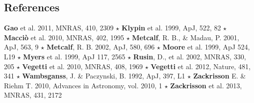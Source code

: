 \documentclass[a4paper, 11pt]{article}
\begin{document}
\subsection*{References}
{\bf Gao} et al. 2011, MNRAS, 410, 2309 $\star$
{\bf Klypin} et al. 1999, ApJ, 522, 82 $\star$
{\bf Macci\`o} et al. 2010, MNRAS, 402, 1995 $\star$
{\bf Metcalf}, R. B., \& Madau, P. 2001, ApJ, 563, 9 $\star$
{\bf Metcalf}, R. B. 2002, ApJ, 580, 696 $\star$
{\bf Moore} et al. 1999, ApJ 524, L19 $\star$
{\bf Myers} et al. 1999, ApJ 117, 2565 $\star$
{\bf Rusin}, D., et al. 2002, MNRAS, 330, 205 $\star$
{\bf Vegetti} et al. 2010, MNRAS, 408, 1969 $\star$
{\bf Vegetti} et al. 2012, Nature, 481, 341 $\star$
{\bf Wambsganss}, J. \& Paczynski, B. 1992, ApJ, 397, L1 $\star$
{\bf Zackrisson} E. \& Riehm T. 2010, Advances in Astronomy, vol. 2010, 1 $\star$
{\bf Zackrisson} et al. 2013, MNRAS, 431, 2172
\end{document}
